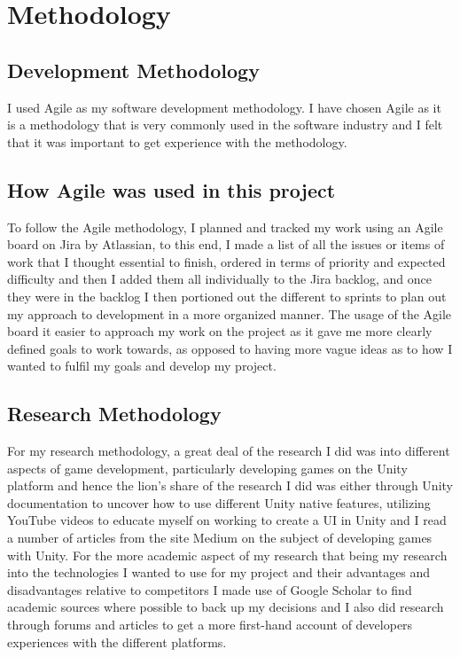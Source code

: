 \chapter{Methodology}
\section{Development Methodology}
I used Agile as my software development methodology. I have chosen Agile as it is a methodology that is very commonly used in the software industry and I felt that it was important to get experience with the methodology.
\section{How Agile was used in this project}
\par
To follow the Agile methodology, I planned and tracked my work using an Agile board on Jira by Atlassian, to this end, I made a list of all the issues or items of work that I thought essential to finish, ordered in terms of priority and expected difficulty and then I added them all individually to the Jira backlog, and once they were in the backlog I then portioned out the different to sprints to plan out my approach to development in a more organized manner. The usage of the Agile board it easier to approach my work on the project as it gave me more clearly defined goals to work towards, as opposed to having more vague ideas as to how I wanted to fulfil my goals and develop my project. 
\section{Research Methodology}
For my research methodology, a great deal of the research I did was into different aspects of game development, particularly developing games on the Unity platform and hence the lion's share of the research I did was either through Unity documentation to uncover how to use different Unity native features, utilizing YouTube videos to educate myself on working to create a UI in Unity and I read a number of articles from the site Medium on the subject of developing games with Unity.
For the more academic aspect of my research that being my research into the technologies I wanted to use for my project and their advantages and disadvantages relative to competitors I made use of Google Scholar to find academic sources where possible to back up my decisions and I also did research through forums and articles to get a more first-hand account of developers experiences with the different platforms.  
